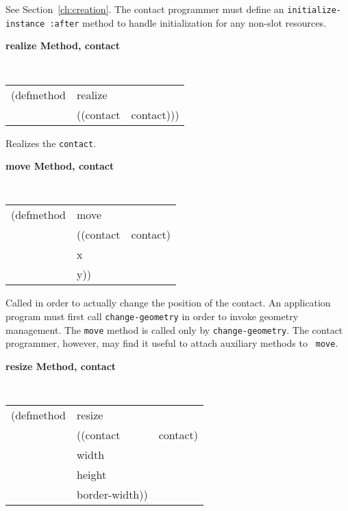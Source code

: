 \begin{flushright} \parbox[t]{6.125in}{
See Section~\ref{ch:creation}. The contact programmer must define an
{\tt initialize-instance :after} method to  
handle initialization for any non-slot resources.
 
}\end{flushright}



{\large {\bf realize \hfill Method, contact}}
\begin{flushright} \parbox[t]{6.125in}{
\tt
\begin{tabular}{lll}
\raggedright
(defmethod & realize & \\
& ((contact  &contact)))
\end{tabular}
\rm

}\end{flushright}

\begin{flushright} \parbox[t]{6.125in}{
Realizes the {\tt contact}.
}\end{flushright}


{\large {\bf move \hfill Method, contact}}
\begin{flushright}
\parbox[t]{6.125in}{
\tt
\begin{tabular}{lll}
\raggedright
(defmethod & move & \\
& ((contact  &contact)\\
& x & \\
& y))
\end{tabular}
\rm

Called in order to actually change the position of the contact.
An application program must first call {\tt change-geometry} 
in
order to invoke geometry management. The {\tt move} method is called only by {\tt change-geometry}.
The contact programmer, however, may find it useful to attach auxiliary methods to {\tt
move}.

}\end{flushright}

{\samepage
{\large {\bf resize \hfill Method, contact}}
\begin{flushright}
\parbox[t]{6.125in}{
\tt
\begin{tabular}{lll}
\raggedright
(defmethod & resize & \\
& ((contact  &contact)\\
& width & \\
& height   \\
&border-width))
\end{tabular}
\rm
}\end{flushright}
}

